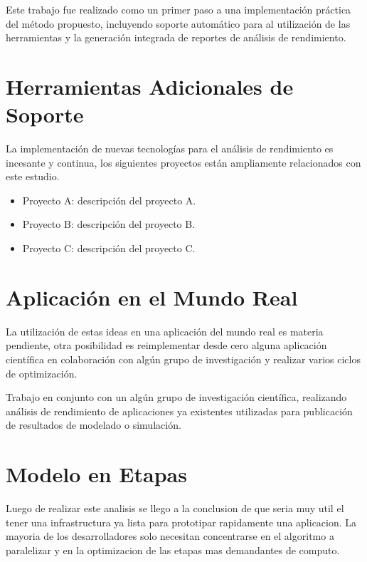 \documentclass[a4paper]{report}
\begin{document}
Este trabajo fue realizado como un primer paso a una implementaci\'on pr\'actica del m\'etodo propuesto,
incluyendo soporte autom\'atico para al utilizaci\'on de las herramientas y la generaci\'on integrada de
reportes de an\'alisis de rendimiento.

\section{Herramientas Adicionales de Soporte}

La implementaci\'on de nuevas tecnolog\'ias para el an\'alisis de rendimiento
es incesante y continua, los siguientes proyectos est\'an ampliamente
relacionados con este estudio.

\begin{itemize}
\item Proyecto A: descripci\'on del proyecto A.
\item Proyecto B: descripci\'on del proyecto B.
\item Proyecto C: descripci\'on del proyecto C.
\end{itemize}

\section{Aplicaci\'on en el Mundo Real}

La utilizaci\'on de estas ideas en una aplicaci\'on del mundo real es materia
pendiente, otra posibilidad es reimplementar desde cero alguna aplicaci\'on
cient\'ifica en colaboraci\'on con alg\'un grupo de investigaci\'on y realizar
varios ciclos de optimizaci\'on.

\bigskip

Trabajo en conjunto con un alg\'un grupo de investigaci\'on cient\'ifica,
realizando an\'alisis de rendimiento de aplicaciones ya existentes utilizadas
para publicaci\'on de resultados de modelado o simulaci\'on.

\section{Modelo en Etapas}

Luego de realizar este analisis se llego a la conclusion de que seria muy util
el tener una infrastructura ya lista para prototipar rapidamente una aplicacion.
La mayoria de los desarrolladores solo necesitan concentrarse en el algoritmo a
paralelizar y en la optimizacion de las etapas mas demandantes de computo.
\end{document}
